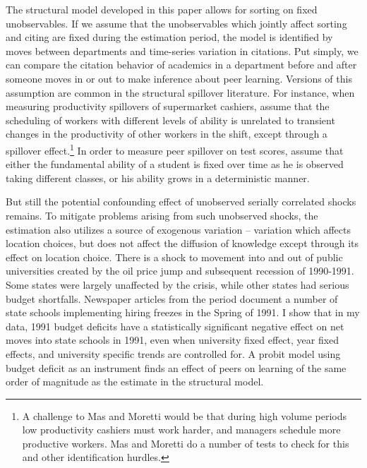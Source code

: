 \documentclass[]{article}
\begin{document}
The structural model developed in this paper allows for sorting on fixed
unobservables. If we assume that the unobservables which jointly affect
sorting and citing are fixed during the estimation period, the model is
identified by moves between departments and time-series variation in
citations. Put simply, we can compare the citation behavior of academics
in a department before and after someone moves in or out to make
inference about peer learning. Versions of this assumption are common in
the structural spillover literature. For instance, when measuring
productivity spillovers of supermarket cashiers, \citet{mas2009peers}
assume that the scheduling of workers with different levels of ability is unrelated
to transient changes in the productivity of other workers in the shift,
except through a spillover effect.\footnote{A
challenge to Mas and Moretti would be that during high volume periods
low productivity cashiers must work harder, and managers schedule more
productive workers.  Mas and Moretti do a number of tests to check for
this and other identification hurdles.}
In order to measure peer spillover on test scores,
\citet{arcidiacono2012estimating} assume that either the fundamental ability of a
student is fixed over time as he is observed taking different classes,
or his ability grows in a deterministic manner.

But still the potential confounding effect of unobserved serially
correlated shocks remains. To mitigate problems arising from such
unobserved shocks, the estimation also utilizes a source of exogenous
variation -- variation which affects location choices, but does not
affect the diffusion of knowledge except through its effect on location
choice. There is a shock to movement into and out of public universities
created by the oil price jump and subsequent recession of 1990-1991.
Some states were largely unaffected by the crisis, while other states
had serious budget shortfalls. Newspaper articles from the period
document a number of state schools implementing hiring freezes in the
Spring of 1991. I show that in my data, 1991 budget deficits have a
statistically significant negative effect on net moves into state
schools in 1991, even when university fixed effect, year fixed effects,
and university specific trends are controlled for. A probit model
using budget deficit as an instrument finds an effect of peers on
learning of the same order of magnitude as the estimate in the
structural model.
\end{document}
